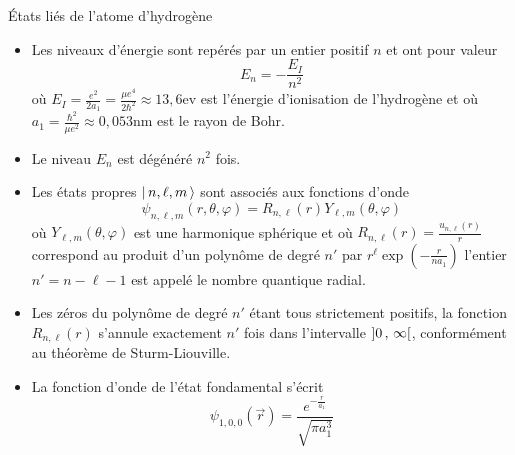        \begin{omed}{États liés de l’atome d’hydrogène}
            \begin{itemize}
                \item Les niveaux d’énergie sont repérés par un entier positif $n$ et ont pour valeur
                \[ E_n = - \frac{E_I}{n^2} \]   
                où $E_I = \frac{e^2}{2 a_1} = \frac{\mu e^4}{2 \hbar^2} \approx 13,6\text{ev}$ est l’énergie d’ionisation de l’hydrogène et où $a_1 = \frac{\hbar^2}{\mu e^2} \approx 0,053\text{nm}$ est le rayon de Bohr.
                \item Le niveau $E_n$ est dégénéré $n^2$ fois.
                \item Les états propres $\left| \, n,\ell,m \, \right>$ sont associés aux fonctions d’onde
                \[ \psi_{n,\ell,m}(r, \theta, \varphi) = R_{n, \ell}(r)Y_{\ell, m}(\theta, \varphi) \]   
                où $Y_{\ell, m}(\theta, \varphi)$ est une harmonique sphérique et où $R_{n, \ell}(r) = \frac{u_{n, \ell}(r)}{r}$ correspond au produit d’un polynôme de degré $n'$ par $r^{\ell} \exp\left(-\frac{r}{n a_1}\right)$ l’entier $n' = n - \ell - 1$ est appelé le nombre quantique radial.
                \item Les zéros du polynôme de degré $n'$ étant tous strictement positifs, la fonction $R_{n, \ell}(r)$ s’annule exactement $n'$ fois dans l’intervalle $\left] 0 \, , \, \infty \right[$, conformément au théorème de Sturm-Liouville.
                \item La fonction d’onde de l’état fondamental s’écrit 
                \[ \psi_{1,0,0}(\vec{r}) = \frac{e^{-\frac{r}{a_1}}}{\sqrt{\pi a_1^3}} \]
            \end{itemize}
        \end{omed}


